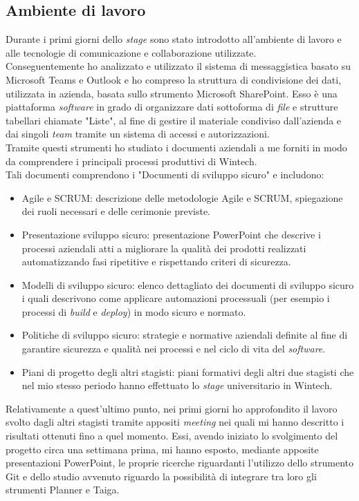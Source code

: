 \subsection{Ambiente di lavoro}
Durante i primi giorni dello \emph{stage} sono stato introdotto all'ambiente di lavoro e alle tecnologie di comunicazione e collaborazione utilizzate.\\
Conseguentemente ho analizzato e utilizzato il sistema di messaggistica basato su Microsoft Teams e Outlook e ho compreso la struttura di condivisione dei dati, utilizzata in azienda, basata sullo strumento Microsoft SharePoint.
Esso è una piattaforma \emph{software} in grado di organizzare dati sottoforma di \emph{file} e strutture tabellari chiamate "Liste", al fine di gestire il materiale condiviso dall'azienda e dai singoli \emph{team} tramite un sistema di accessi e autorizzazioni.\\
Tramite questi strumenti ho studiato i documenti aziendali a me forniti in modo da comprendere i principali processi produttivi di Wintech.\\ 
Tali documenti comprendono i "Documenti di sviluppo sicuro" e includono:
\begin{itemize}
    \item Agile e SCRUM: descrizione delle metodologie Agile e SCRUM, spiegazione dei ruoli necessari e delle cerimonie previste. 
    \item Presentazione sviluppo sicuro: presentazione PowerPoint che descrive i processi aziendali atti a migliorare la qualità dei prodotti realizzati automatizzando fasi ripetitive e rispettando criteri di sicurezza. 
    \item Modelli di sviluppo sicuro: elenco dettagliato dei documenti di sviluppo sicuro i quali descrivono come applicare automazioni processuali (per esempio i processi di \emph{build} e \emph{deploy}) in modo sicuro e normato. 
    \item Politiche di sviluppo sicuro: strategie e normative aziendali definite al fine di garantire sicurezza e qualità nei processi e nel ciclo di vita del \emph{software}. 
    \item Piani di progetto degli altri stagisti: piani formativi degli altri due stagisti che nel mio stesso periodo hanno effettuato lo \emph{stage} universitario in Wintech. 
\end{itemize}
Relativamente a quest'ultimo punto, nei primi giorni ho approfondito il lavoro svolto dagli altri stagisti tramite appositi \emph{meeting} nei quali mi hanno descritto i risultati ottenuti fino a quel momento. Essi, avendo iniziato lo svolgimento del progetto circa una settimana prima, mi hanno esposto, mediante apposite presentazioni PowerPoint, le proprie ricerche riguardanti l'utilizzo dello strumento Git e dello studio avvenuto riguardo la possibilità di integrare tra loro gli strumenti Planner e Taiga. 


